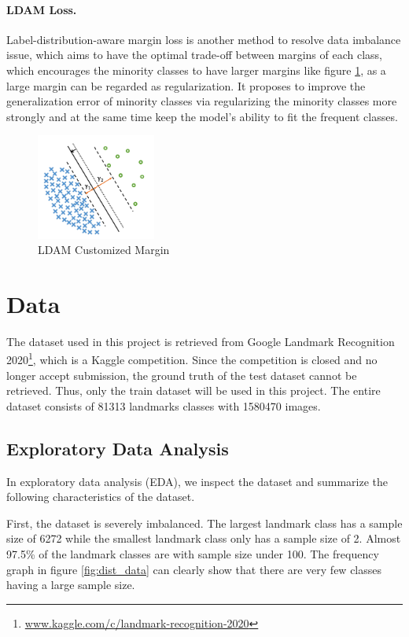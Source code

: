 \documentclass[10pt,twocolumn,letterpaper]{article}
\begin{document}
\paragraph{LDAM Loss.} Label-distribution-aware margin loss \cite{cao_learning_2019} is another method to resolve data imbalance issue, which aims to have the optimal trade-off between margins of each class, which encourages the minority classes to have larger margins like figure \ref{fig:ldam_magin}, as a large margin can be regarded as regularization. It proposes to improve the generalization error of minority classes via regularizing the minority classes more strongly and at the same time keep the model's ability to fit the frequent classes.

\begin{figure}
    \centering
    \includegraphics[width=0.35\textwidth]{COMP4471_Final_Report/img/ldam_margin.png}
    \caption{LDAM Customized Margin\cite{}}
    \label{fig:ldam_magin}
\end{figure}

\section{Data}
The dataset used in this project is retrieved from Google Landmark Recognition 2020\footnote{\url{www.kaggle.com/c/landmark-recognition-2020}}, which is a Kaggle competition. Since the competition is closed and no longer accept submission, the ground truth of the test dataset cannot be retrieved. Thus, only the train dataset will be used in this project. The entire dataset consists of 81313 landmarks classes with 1580470 images.

\subsection{Exploratory Data Analysis}
In exploratory data analysis (EDA), we inspect the dataset and summarize the following characteristics of the dataset.

First, the dataset is severely imbalanced. The largest landmark class has a sample size of 6272 while the smallest landmark class only has a sample size of 2. Almost 97.5\% of the landmark classes are with sample size under 100. The frequency graph in figure \ref{fig:dist_data} can clearly show that there are very few classes having a large sample size.
\end{document}
